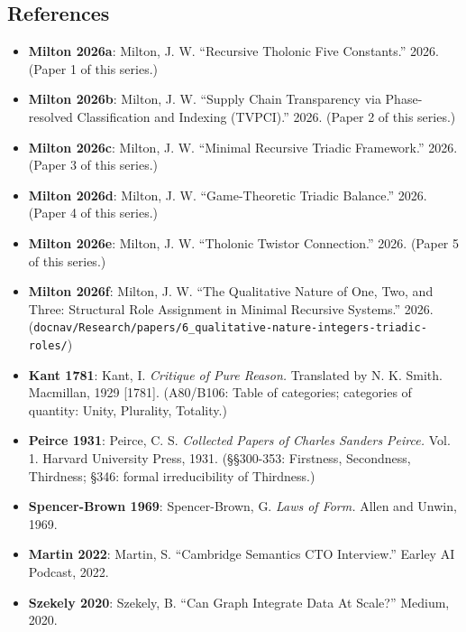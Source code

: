 \documentclass[
  11pt,
  letterpaper,
]{article}
\providecommand{\tightlist}{%
  \setlength{\itemsep}{0pt}\setlength{\parskip}{0pt}}
\begin{document}
\subsection{References}\label{references}

\begin{itemize}
\tightlist
\item
  \textbf{Milton 2026a}: Milton, J. W. ``Recursive Tholonic Five
  Constants.'' 2026. (Paper 1 of this series.)
\item
  \textbf{Milton 2026b}: Milton, J. W. ``Supply Chain Transparency via
  Phase-resolved Classification and Indexing (TVPCI).'' 2026. (Paper 2
  of this series.)
\item
  \textbf{Milton 2026c}: Milton, J. W. ``Minimal Recursive Triadic
  Framework.'' 2026. (Paper 3 of this series.)
\item
  \textbf{Milton 2026d}: Milton, J. W. ``Game-Theoretic Triadic
  Balance.'' 2026. (Paper 4 of this series.)
\item
  \textbf{Milton 2026e}: Milton, J. W. ``Tholonic Twistor Connection.''
  2026. (Paper 5 of this series.)
\item
  \textbf{Milton 2026f}: Milton, J. W. ``The Qualitative Nature of One,
  Two, and Three: Structural Role Assignment in Minimal Recursive
  Systems.'' 2026.
  (\texttt{docnav/Research/papers/6\_qualitative-nature-integers-triadic-roles/})
\item
  \textbf{Kant 1781}: Kant, I. \emph{Critique of Pure Reason.}
  Translated by N. K. Smith. Macmillan, 1929 {[}1781{]}. (A80/B106:
  Table of categories; categories of quantity: Unity, Plurality,
  Totality.)
\item
  \textbf{Peirce 1931}: Peirce, C. S. \emph{Collected Papers of Charles
  Sanders Peirce.} Vol. 1. Harvard University Press, 1931. (§§300-353:
  Firstness, Secondness, Thirdness; §346: formal irreducibility of
  Thirdness.)
\item
  \textbf{Spencer-Brown 1969}: Spencer-Brown, G. \emph{Laws of Form.}
  Allen and Unwin, 1969.
\item
  \textbf{Martin 2022}: Martin, S. ``Cambridge Semantics CTO
  Interview.'' Earley AI Podcast, 2022.
\item
  \textbf{Szekely 2020}: Szekely, B. ``Can Graph Integrate Data At
  Scale?'' Medium, 2020.
\end{itemize}
\end{document}
